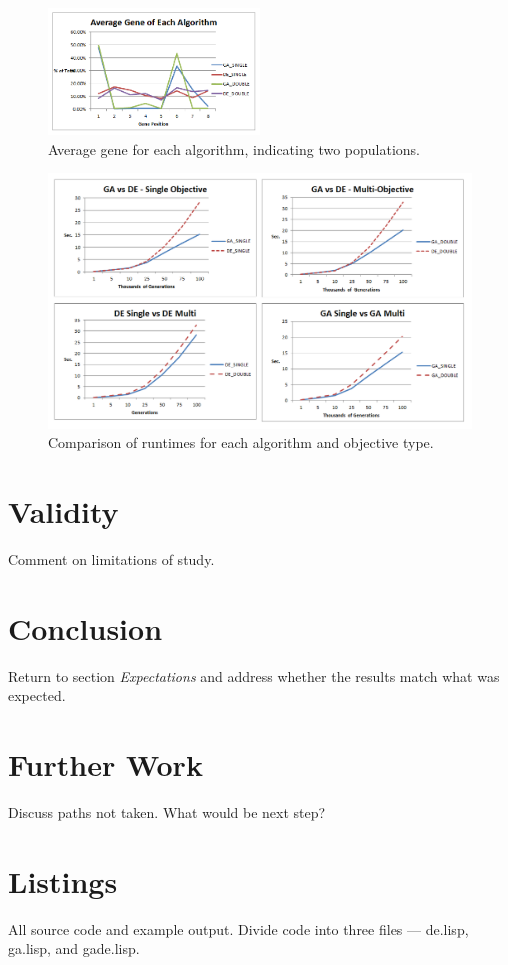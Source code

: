\documentclass{sig-alternate}
\begin{document}
\begin{figure}
\centering
\includegraphics[width=0.5\textwidth]{avg_gene.png}
\caption{Average gene for each algorithm, indicating two populations.}
\end{figure}

\begin{figure}
\centering
\includegraphics[width=1.0\textwidth]{runtimes.png}
\caption{Comparison of runtimes for each algorithm and objective type.}
\end{figure}

\section{Validity}
Comment on limitations of study.

\section{Conclusion}
Return to section \emph{Expectations} and address whether the results
match what was expected.

\section{Further Work}
Discuss paths not taken.  What would be next step? \cite{Das:DE}




\section{Listings}
All source code and example output. \cite{DEMO}  Divide code into three files
--- de.lisp, ga.lisp, and gade.lisp. \cite {LOL}
\end{document}
